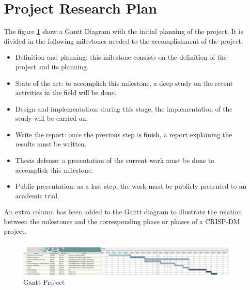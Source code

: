 \section{Project Research Plan}

The figure \ref{fig:gantt} show a Gantt Diagram with the initial planning of the project.
It is divided in the following milestones needed to the accomplishment of the project:

\begin{itemize}
    \item Definition and planning: this milestone consists on the definition of the project and its planning.
    \item State of the art: to accomplish this milestone, a deep study on the recent activities in the field will be done.
    \item Design and implementation: during this stage, the implementation of the study will be carried on.
    \item Write the report: once the previous step is finish, a report explaining the results must be written.
    \item Thesis defense: a presentation of the current work must be done to accomplish this milestone.
    \item Public presentation: as a last step, the work must be publicly presented to an academic trial.
\end{itemize}

An extra column has been added to the Gantt diagram to illustrate the relation between the milestones and the corresponding phase or phases of a CRISP-DM project.

\begin{figure}[h]
    \centering
    \includegraphics[angle=90, width=\textwidth,height=\textheight,keepaspectratio]{../figs/TFM_plan.png}
    \caption{Gantt Project}
    \label{fig:gantt}
\end{figure}